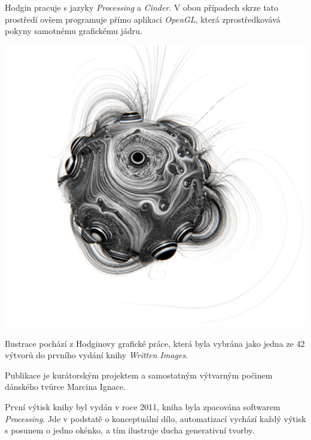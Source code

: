 \documentclass[10pt,twoside=true,open=right,cleardoublepage=empty,chapterprefix=true]{scrbook}
\begin{document}
Hodgin pracuje s jazyky {\em Processing} a {\em Cinder}. V obou případech skrze tato prostředí ovšem programuje přímo aplikaci {\em OpenGL}, která zprostředkovává pokyny samotnému grafickému jádru.

\vfill
\newpage

\begin{centering}
\includegraphics[width = 1\textwidth]{imgs/hogin.png}
\end{centering}

Ilustrace pochází z Hodginovy   grafické práce, která byla vybrána jako jedna ze 42 výtvorů do prvního vydání knihy {\em Written Images}.

Publikace je kurátorským projektem a samostatným výtvarným počinem dánského tvůrce Marcina Ignace. 

První výtisk knihy byl vydán v roce 2011, kniha byla zpacována softwarem {\em Processing}. Jde v podstatě o konceptuální dílo, automatizací vychází každý výtisk s posunem o jedno okénko, a tím ilustruje ducha generativní tvorby.

\vfill
\end{document}
